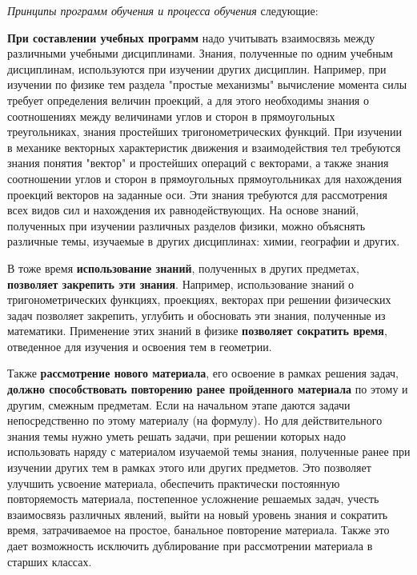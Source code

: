 \textit{Принципы программ обучения и процесса обучения} следующие:
\begin{textitemize}
	\item \textbf{При составлении учебных программ} надо учитывать взаимосвязь между различными учебными дисциплинами. Знания, полученные по одним учебным дисциплинам, используются при изучении других дисциплин. Например, при изучении по физике тем раздела "простые механизмы"{} вычисление момента силы требует определения величин проекций, а для этого необходимы знания о соотношениях между величинами углов и сторон в прямоугольных треугольниках, знания простейших тригонометрических функций. При изучении в механике векторных характеристик движения и взаимодействия тел требуются знания понятия "вектор"{} и простейших операций с векторами, а также знания соотношении углов и сторон в прямоугольных прямоугольниках для нахождения проекций векторов на заданные оси. Эти знания требуются для рассмотрения всех видов сил и нахождения их равнодействующих. На основе знаний, полученных при изучении различных разделов физики, можно объяснять различные темы, изучаемые в других дисциплинах: химии, географии и других.
	\item В тоже время \textbf{использование знаний}, полученных в других предметах, \textbf{позволяет закрепить эти знания}. Например, использование знаний о тригонометрических функциях, проекциях, векторах при решении физических задач позволяет закрепить, углубить и обосновать эти знания, полученные из математики. Применение этих знаний в физике \textbf{позволяет сократить время}, отведенное для изучения и освоения тем в геометрии. 
	\item Также \textbf{рассмотрение нового материала}, его освоение в рамках решения задач, \textbf{должно способствовать повторению ранее пройденного материала} по этому и другим, смежным предметам. Если на начальном этапе даются задачи непосредственно по этому материалу (на формулу). Но для действительного знания темы нужно уметь решать задачи, при решении которых надо использовать наряду с материалом изучаемой темы знания, полученные ранее при изучении других тем в рамках этого или других предметов. Это позволяет улучшить усвоение материала, обеспечить практически постоянную повторяемость материала, постепенное усложнение решаемых задач, учесть взаимосвязь различных явлений, выйти на новый уровень знания и сократить время, затрачиваемое на простое, банальное повторение материала. Также это дает возможность исключить дублирование при рассмотрении материала в старших классах.

\end{textitemize}
